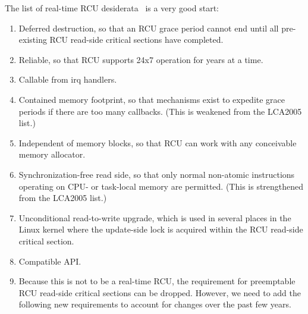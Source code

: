 The list of real-time RCU desiderata~\cite{PaulMcKenney05b}
is a very good start:

\begin{enumerate}
\item	Deferred destruction, so that an RCU grace period cannot end
	until all pre-existing RCU read-side critical sections have
	completed.
\item	Reliable, so that RCU supports 24x7 operation for years at
	a time.
\item	Callable from irq handlers.
\item	Contained memory footprint, so that mechanisms exist to expedite
	grace periods if there are too many callbacks.  (This is weakened
	from the LCA2005 list.)
\item	Independent of memory blocks, so that RCU can work with any
	conceivable memory allocator.
\item	Synchronization-free read side, so that only normal non-atomic
	instructions operating on CPU- or task-local memory are permitted.
	(This is strengthened from the LCA2005 list.)
\item	Unconditional read-to-write upgrade, which is used in several
	places in the Linux kernel where the update-side lock is
	acquired within the RCU read-side critical section.
\item	Compatible API.

\item	Because this is not to be a real-time RCU, the requirement for
	preemptable RCU read-side critical sections can be dropped.
	However, we need to add the following new requirements to account
	for changes over the past few years.


\end{enumerate}
